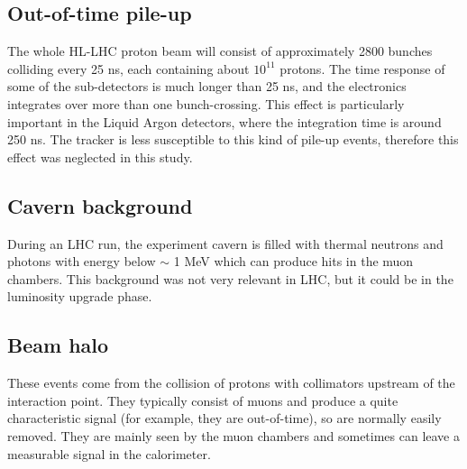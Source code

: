 \documentclass[a4paper,twoside,12pt]{book}
\begin{document}

\subsection*{Out-of-time pile-up}
The whole HL-LHC proton beam will consist of approximately 2800 bunches colliding every 25 ns, each containing about $10^{11}$ protons. The time response of some of the 
sub-detectors is much longer than 25 ns, and the electronics integrates over more than one
bunch-crossing. This effect is particularly important in the Liquid Argon detectors, where
the integration time is around 250 ns\cite{ATLAS_pileup}. The tracker is less susceptible to this kind of 
pile-up events, therefore this effect was neglected in this study.

\subsection*{Cavern background}
During an LHC run, the experiment cavern is filled with thermal neutrons and photons with 
energy below $\sim$ 1 MeV which can produce hits in the muon chambers. This background
was not very relevant in LHC, but it could be in the luminosity upgrade phase\cite{ATLAS_pileup}.

\subsection*{Beam halo}
These events come from the collision of protons with collimators upstream of the 
interaction point. They typically consist of muons and produce a quite characteristic signal (for example, they are out-of-time), so are normally easily removed. They are mainly seen by the muon chambers and sometimes
can leave a measurable signal in the calorimeter\cite{ATLAS_pileup}. 
\end{document}

